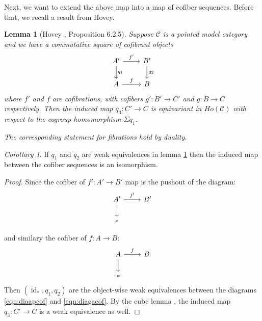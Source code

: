 \documentclass{article}
\newcommand{\cC}{\mathcal{C}}
\DeclareMathOperator{\id}{id}
\newtheorem{lemma}[theorem]{Lemma}
\theoremstyle{definition}
\theoremstyle{remark}
\newtheorem{corollary}[theorem]{Corollary}
\begin{document}
Next, we want to extend the above map into a map of cofiber sequences. Before that, we recall a result from Hovey.
\begin{lemma}[Hovey \cite{MR1650134}, Proposition 6.2.5] \label{lem:extcofib}
Suppose $\cC$ is a pointed model category and we have a commutative square of cofibrant objects
\[
  \begin{tikzcd}
        A' \arrow{r}{f'} \arrow{d}{q_{1}} \arrow[swap]{d} & B' \arrow{d}{q_{2}} \\
        A \arrow{r}{f} & B
  \end{tikzcd}
\] 
where $f'$ and $f$ are cofibrations, with cofibers $g':B' \rightarrow C'$ and $g: B \rightarrow C$ respectively. 
Then the induced map $q_{3}:C' \rightarrow C$ is equivariant in $Ho(\cC)$ with respect to the cogroup homomorphism $\Sigma q_{1}$.

The corresponding statement for fibrations hold by duality.   
\end{lemma}
\begin{corollary} \label{cor:indcisom}
    If $q_{1}$ and $q_{2}$ are weak equivalences in lemma \ref{lem:extcofib} then the induced map between the
    cofiber sequences is an isomorphism.
\end{corollary}
\begin{proof}
Since the cofiber of  $f': A' \rightarrow B'$ map is the pushout of the diagram: 
\begin{equation} \label{eqn:diaapcof}
    \begin{tikzcd}
       A' \arrow{r}{f'}  \arrow[swap]{d} & B'  \\
        * 
     \end{tikzcd}
\end{equation} 

and similary the cofiber of $f: A \rightarrow B$:
\begin{equation} \label{eqn:diagacof}
    \begin{tikzcd}
       A \arrow{r}{f}  \arrow[swap]{d} & B \\
        * 
     \end{tikzcd}
\end{equation} 
    Then $(\id_{*},q_{1},q_{2})$ are the object-wise weak equivalences between the diagrams \eqref{eqn:diaapcof} and 
    \eqref{eqn:diagacof}. By the cube lemma \cite[lemma 5.2.6]{MR1650134}, the induced map $q_{3}: C' \rightarrow C$
    is a weak equivalence as well.
\end{proof}
\end{document}
